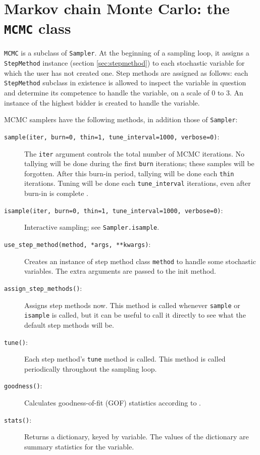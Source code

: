 \hypertarget{mcmc}{}
\section*{Markov chain Monte Carlo: the \texttt{MCMC} class} \label{sec:mcmc}
 \texttt{MCMC} is a subclass of \texttt{Sampler}. At the beginning of a sampling loop, it assigns a \texttt{StepMethod} instance (section \ref{sec:stepmethod}) to each stochastic variable for which the user has not created one. Step methods are assigned as follows: each \texttt{StepMethod} subclass in existence is allowed to inspect the variable in question and determine its competence to handle the variable, on a scale of 0 to 3. An instance of the highest bidder is created to handle the variable.

MCMC samplers have the following methods, in addition those of \texttt{Sampler}:
\begin{description}
    \item[\texttt{sample(iter, burn=0, thin=1, tune\_interval=1000, verbose=0)}:] The \texttt{iter} argument controls the total number of MCMC iterations. No tallying will be done during the first \texttt{burn} iterations; these samples will be forgotten. After this burn-in period, tallying will be done each \texttt{thin} iterations. Tuning will be done each \texttt{tune\_interval} iterations, even after burn-in is complete \cite{tuning,Haario:2001lr}.
    \item[\texttt{isample(iter, burn=0, thin=1, tune\_interval=1000, verbose=0)}:] Interactive sampling; see \texttt{Sampler.isample}.
    \item[\texttt{use_step_method(method, *args, **kwargs)}:] Creates an instance of step method class \texttt{method} to handle some stochastic variables. The extra arguments are passed to the init method.
    \item[\texttt{assign_step_methods()}:] Assigns step methods now. This method is called whenever \texttt{sample} or \texttt{isample} is called, but it can be useful to call it directly to see what the default step methods will be.
    \item[\texttt{tune()}:] Each step method's \texttt{tune} method is called. This method is called periodically throughout the sampling loop.
    \item[\texttt{goodness()}:] Calculates goodness-of-fit (GOF) statistics according to \cite{Brooks:2000il}.
    \item[\texttt{stats()}:] Returns a dictionary, keyed by variable. The values of the dictionary are summary statistics for the variable.
\end{description}

